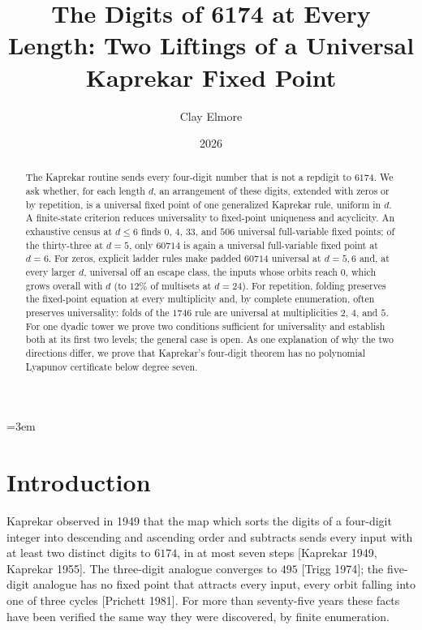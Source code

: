\documentclass[11pt,letterpaper]{article}
\title{The Digits of 6174 at Every Length: Two Liftings of a Universal Kaprekar Fixed Point}
\author{Clay Elmore}
\date{2026}
\theoremstyle{paperstyle}
\theoremstyle{paperstyledef}
\theoremstyle{paperstylerem}
\begin{document}
\emergencystretch=3em
\maketitle

\begin{abstract}
The Kaprekar routine sends every four-digit number that is not a repdigit to \(6174\). We ask whether, for each length \(d\), an arrangement of these digits, extended with zeros or by repetition, is a universal fixed point of one generalized Kaprekar rule, uniform in \(d\). A finite-state criterion reduces universality to fixed-point uniqueness and acyclicity. An exhaustive census at \(d \leq 6\) finds \(0\), \(4\), \(33\), and \(506\) universal full-variable fixed points; of the thirty-three at \(d = 5\), only \(60714\) is again a universal full-variable fixed point at \(d = 6\). For zeros, explicit ladder rules make padded \(60714\) universal at \(d = 5, 6\) and, at every larger \(d\), universal off an escape class, the inputs whose orbits reach \(0\), which grows overall with \(d\) (to \(12\%\) of multisets at \(d = 24\)). For repetition, folding preserves the fixed-point equation at every multiplicity and, by complete enumeration, often preserves universality: folds of the \(1746\) rule are universal at multiplicities \(2\), \(4\), and \(5\). For one dyadic tower we prove two conditions sufficient for universality and establish both at its first two levels; the general case is open. As one explanation of why the two directions differ, we prove that Kaprekar's four-digit theorem has no polynomial Lyapunov certificate below degree seven.
\end{abstract}

\section{Introduction}\label{introduction}

Kaprekar observed in 1949 that the map which sorts the digits of a four-digit integer into descending and ascending order and subtracts sends every input with at least two distinct digits to \(6174\), in at most seven steps {[}Kaprekar 1949, Kaprekar 1955{]}. The three-digit analogue converges to \(495\) {[}Trigg 1974{]}; the five-digit analogue has no fixed point that attracts every input, every orbit falling into one of three cycles {[}Prichett 1981{]}. For more than seventy-five years these facts have been verified the same way they were discovered, by finite enumeration.
\end{document}
